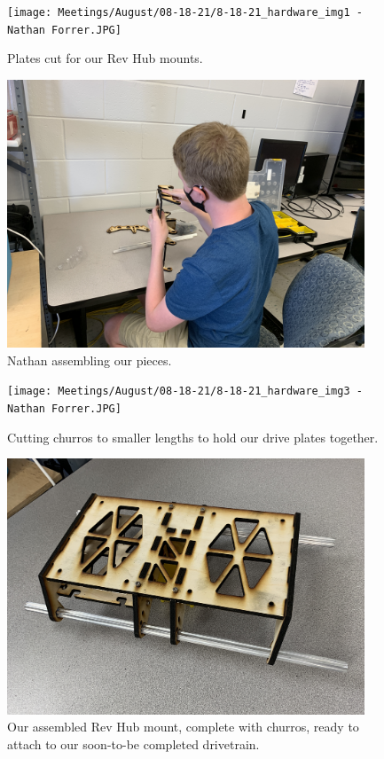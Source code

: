 \begin{figure}[ht]
\centering
\begin{minipage}[b]{.48\textwidth}
  \centering
  \texttt{[image: Meetings/August/08-18-21/8-18-21\_hardware\_img1 - Nathan Forrer.JPG]}
  \caption{Plates cut for our Rev Hub mounts.}
  \label{fig:pic1}
\end{minipage}%
\hfill%
\begin{minipage}[b]{.48\textwidth}
  \centering
  \includegraphics[width=0.95\textwidth]{Meetings/August/08-18-21/8-18-21_hardware_img2 - Nathan Forrer.JPG}
  \caption{Nathan assembling our pieces.}
  \label{fig:pic2}
\end{minipage}
\end{figure}

\begin{figure}[ht]
\centering
\begin{minipage}[b]{.48\textwidth}
  \centering
  \texttt{[image: Meetings/August/08-18-21/8-18-21\_hardware\_img3 - Nathan Forrer.JPG]}
  \caption{Cutting churros to smaller lengths to hold our drive plates together.}
  \label{fig:pic3}
\end{minipage}%
\hfill%
\begin{minipage}[b]{.48\textwidth}
  \centering
  \includegraphics[width=0.95\textwidth]{Meetings/August/08-18-21/8-18-21_hardware_img4 - Nathan Forrer.JPG}
  \caption{Our assembled Rev Hub mount, complete with churros, ready to attach to our soon-to-be completed drivetrain.}
  \label{fig:pic4}
\end{minipage}
\end{figure}